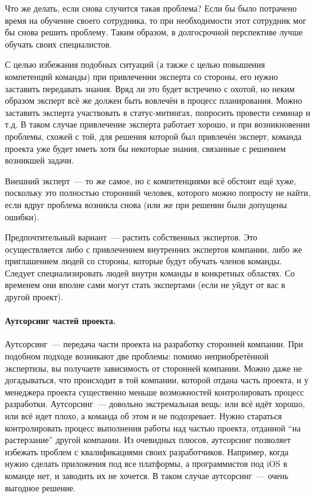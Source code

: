\documentclass{../../text-style}
\begin{document}
Что же делать, если снова случится такая проблема? Если бы было потрачено время на обучение своего сотрудника, то при необходимости этот сотрудник мог бы снова решить проблему. Таким образом, в долгосрочной перспективе лучше обучать своих специалистов.

С целью избежания подобных ситуаций (а также с целью повышения компетенций команды) при привлечении эксперта со стороны, его нужно заставить передавать знания. Вряд ли это будет встречено с охотой, но неким образом эксперт всё же должен быть вовлечён в процесс планирования. Можно заставить эксперта участвовать в статус-митингах, попросить провести семинар и т.д. В таком случае привлечение эксперта работает хорошо, и при возникновении проблемы, схожей с той, для решения которой был привлечён эксперт, команда проекта уже будет иметь хотя бы некоторые знания, связанные с решением возникшей задачи.

Внешний эксперт~--- то же самое, но с компетенциями всё обстоит ещё хуже, поскольку это полностью сторонний человек, которого можно попросту не найти, если вдруг проблема возникла снова (или же при решении были допущены ошибки).

Предпочтительный вариант~--- растить собственных экспертов. Это осуществляется либо с привлечением внутренних экспертов компании, либо же приглашением людей со стороны, которые будут обучать членов команды. Следует специализировать людей внутри команды в конкретных областях. Со временем они вполне сами могут стать экспертами (если не уйдут от вас в другой проект).

\paragraph{Аутсорсинг частей проекта.} Аутсорсинг~--- передача части проекта на разработку сторонней компании. При подобном подходе возникают две проблемы: помимо неприобретённой экспертизы, вы получаете зависимость от сторонней компании. Можно даже не догадываться, что происходит в той компании, которой отдана часть проекта, и у менеджера проекта существенно меньше возможностей контролировать процесс разработки. Аутсорсинг~--- довольно экстремальная вещь: или всё идёт хорошо, или всё идет плохо, а команда об этом и не подозревает. Нужно стараться контролировать процесс выполнения работы над частью проекта, отданной \enquote{на растерзание} другой компании. Из очевидных плюсов, аутсорсинг позволяет избежать проблем с квалификациями своих разработчиков. Например, когда нужно сделать приложения под все платформы, а программистов под iOS в команде нет, и заводить их не хочется. В таком случае аутсорсинг~--- очень выгодное решение.
\end{document}
